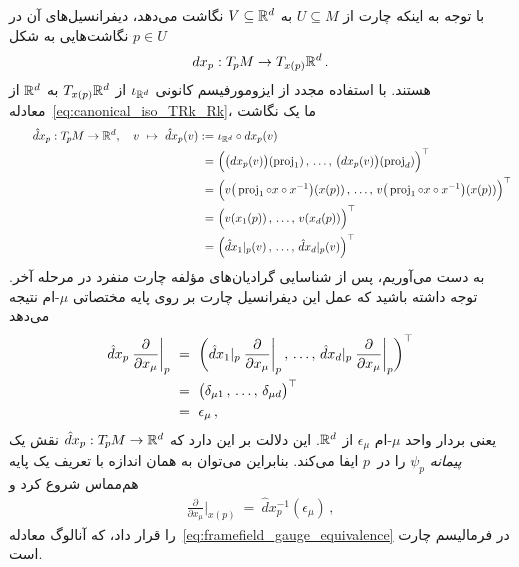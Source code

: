 با توجه به اینکه چارت از $U \subseteq M$ به $V \subseteq \mathbb{R}^d$ نگاشت می‌دهد، دیفرانسیل‌های آن در $p\in U$ نگاشت‌هایی به شکل
\begin{align}
	dx_p: T_{\mkern-1.5mu p}\mkern-.5muM \to T_{x(p)}\mathbb{R}^d \,.
\end{align}
هستند. با استفاده مجدد از ایزومورفیسم کانونی $\iota_{\mathbb{R}^d}$ از $T_{x(p)}\mathbb{R}^d$ به $\mathbb{R}^d$ از معادله~\eqref{eq:canonical_iso_TRk_Rk}، ما یک نگاشت
\begin{align}\label{eq:chart_differential_via_gradients}
	\qquad
	\hat{d}x_p: T_{\mkern-1.5mu p}\mkern-.5muM \to \mathbb{R}^d,\ \ \ v\ \mapsto\ \hat{d}x_p (v)
	:=\ &\iota_{\mathbb{R}^d} \circ dx_p (v) \notag \\
	=\ & \Big( \big(dx_p(v) \big)(\operatorname{proj}_1) \,,\,\dots,\, \big(dx_p(v) \big)(\operatorname{proj}_d) \Big)^\top \notag \\
	=\ & \Big( v\big(\operatorname{proj}_1 \circ x \circ x^{-1}\big)(x(p)) \,,\,\dots,\, v\big(\operatorname{proj}_1 \circ x \circ x^{-1}\big)(x(p)) \Big)^\top \notag \\
	=\ & \Big( v(x_1(p)) \,,\,\dots,\, v(x_d(p)) \Big)^\top \notag \\
	=\ & \Big( \hat{d}x_1 |_p(v) \,,\,\dots,\, \hat{d}x_d |_p(v) \Big)^\top
\end{align}
به دست می‌آوریم، پس از شناسایی گرادیان‌های مؤلفه چارت منفرد در مرحله آخر.
توجه داشته باشید که عمل این دیفرانسیل چارت بر روی پایه مختصاتی $\mu$-ام نتیجه می‌دهد
\begin{align}
	\hat{d}x_p \: \frac{\partial}{\partial x_\mu} \bigg|_p
	\ &=\ \bigg( \hat{d}x_1|_p \: \frac{\partial}{\partial x_\mu} \bigg|_p \,,\,\dots,\, \hat{d}x_d|_p \: \frac{\partial}{\partial x_\mu} \bigg|_p \bigg)^\top \notag \\
	\ &=\ \big( \delta_{\mu1} \,,\,\dots,\, \delta_{\mu d} \big)^\top \notag \\
	\ &=\ \epsilon_\mu \,,
\end{align}
یعنی بردار واحد $\mu$-ام $\epsilon_\mu$ از $\mathbb{R}^d$.
این دلالت بر این دارد که $\hat{d}x_p: T_{\mkern-1.5mu p}\mkern-.5muM \to \mathbb{R}^d$ نقش یک \emph{پیمانه} $\psi_p$ را در~$p$ ایفا می‌کند.
بنابراین می‌توان به همان اندازه با تعریف یک پایه هم‌مماس شروع کرد و
\begin{align}\label{eq:coord_basis_vector_via_chart_differential}
	\frac{\partial}{\partial x_\mu} \bigg|_{x(p)}\ =\ \hat{d}x_p^{-1} (\epsilon_\mu) \,,
\end{align}
را قرار داد، که آنالوگ معادله~\eqref{eq:framefield_gauge_equivalence} در فرمالیسم چارت است.











